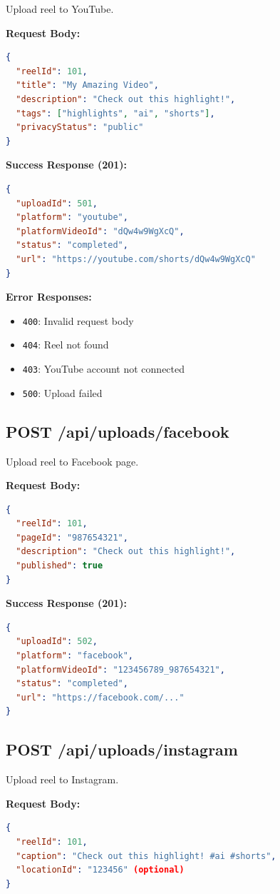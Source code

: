 Upload reel to YouTube.

\textbf{Request Body:}
\begin{lstlisting}[language=JSON]
{
  "reelId": 101,
  "title": "My Amazing Video",
  "description": "Check out this highlight!",
  "tags": ["highlights", "ai", "shorts"],
  "privacyStatus": "public"
}
\end{lstlisting}

\textbf{Success Response (201):}
\begin{lstlisting}[language=JSON]
{
  "uploadId": 501,
  "platform": "youtube",
  "platformVideoId": "dQw4w9WgXcQ",
  "status": "completed",
  "url": "https://youtube.com/shorts/dQw4w9WgXcQ"
}
\end{lstlisting}

\textbf{Error Responses:}
\begin{itemize}
    \item \texttt{400}: Invalid request body
    \item \texttt{404}: Reel not found
    \item \texttt{403}: YouTube account not connected
    \item \texttt{500}: Upload failed
\end{itemize}

\subsection{POST /api/uploads/facebook}

Upload reel to Facebook page.

\textbf{Request Body:}
\begin{lstlisting}[language=JSON]
{
  "reelId": 101,
  "pageId": "987654321",
  "description": "Check out this highlight!",
  "published": true
}
\end{lstlisting}

\textbf{Success Response (201):}
\begin{lstlisting}[language=JSON]
{
  "uploadId": 502,
  "platform": "facebook",
  "platformVideoId": "123456789_987654321",
  "status": "completed",
  "url": "https://facebook.com/..."
}
\end{lstlisting}

\subsection{POST /api/uploads/instagram}

Upload reel to Instagram.

\textbf{Request Body:}
\begin{lstlisting}[language=JSON]
{
  "reelId": 101,
  "caption": "Check out this highlight! #ai #shorts",
  "locationId": "123456" (optional)
}
\end{lstlisting}

